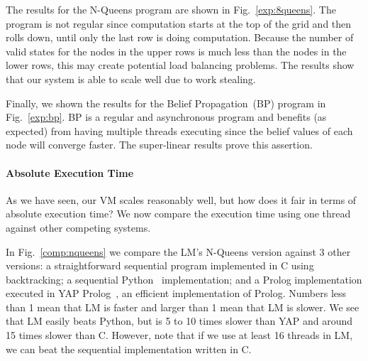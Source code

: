 The results for the N-Queens program are shown in Fig.~\ref{exp:8queens}. The program is not regular since computation starts at the top of the grid and then rolls down, until only the last row is doing computation. Because the number of valid states for the nodes in the upper rows is much less than the nodes in the lower rows, this may create potential load balancing problems. The results show that our system is able to scale well due to work stealing.

Finally, we shown the results for the Belief Propagation~(BP) program in Fig.~\ref{exp:bp}. BP is a regular and asynchronous program
and benefits (as expected) from having multiple threads executing since the belief values of each node will converge faster.
The super-linear results prove this assertion.

\paragraph{Absolute Execution Time}

As we have seen, our VM scales reasonably well, but how does it fair in terms of absolute execution time? We now compare the execution
time using one thread against other competing systems.

In Fig.~\ref{comp:nqueens} we compare the LM's N-Queens version against 3 other versions: a straightforward sequential program implemented
in C using backtracking; a sequential Python~\cite{vanRossum:1995:PRM} implementation; and a Prolog implementation executed in
YAP Prolog~\cite{DBLP:journals/corr/abs-1102-3896}, an efficient implementation of Prolog. Numbers less than 1 mean that LM
is faster and larger than 1 mean that LM is slower. We see that LM easily beats Python, but is 5 to 10 times slower than YAP
and around 15 times slower than C.
However, note that if we use at least 16 threads in LM, we can beat the sequential implementation written in C.

